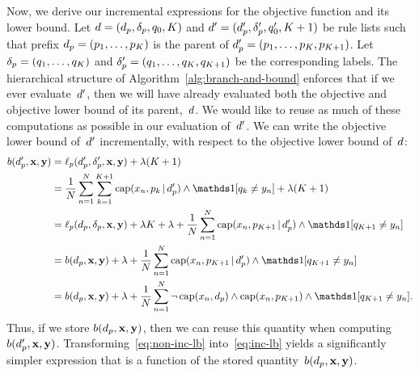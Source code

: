 \begin{arxiv}
Now, we derive our incremental expressions for the objective function and its lower bound.
%
Let ${{d} = (d_p, \delta_p, q_0, K)}$ and
${{d}' = (d_p', \delta_p', q_0', K + 1)}$
be rule lists such that prefix ${d_p = (p_1, \dots, p_K)}$
is the parent of ${d_p' = (p_1, \dots, p_K, p_{K+1})}$.
%
Let ${\delta_p = (q_1, \dots, q_K)}$ and
${\delta_p' = (q_1, \dots, q_K, q_{K+1})}$ be the corresponding labels.
%
The hierarchical structure of Algorithm~\ref{alg:branch-and-bound}
enforces that if we ever evaluate~${d}'$, then we will have already
evaluated both the objective and objective lower bound of its parent,~${d}$.
%
We would like to reuse as much of these computations as possible
in our evaluation of~${d}'$.
%
We can write the objective lower bound of~${d}'$ incrementally,
with respect to the objective lower bound of~${d}$:
\begin{align}
b(\Prefix', \x, \y)
  &= \Loss_p(\Prefix', \Labels', \x, \y) + \Reg (K + 1) \nn \\
&= \frac{1}{N} \sum_{n=1}^N \sum_{k=1}^{K+1} \Cap(x_n, p_k \given \Prefix')
  \wedge \one [ q_k \neq y_n ] + \Reg (K+1) \label{eq:non-inc-lb} \\
&= \Loss_p(\Prefix, \Labels, \x, \y) + \Reg K + \Reg
  + \frac{1}{N} \sum_{n=1}^N \Cap(x_n, p_{K+1} \given \Prefix') \wedge \one [q_{K+1} \neq y_n ] \nn \\
&= b(\Prefix, \x, \y) + \Reg
  + \frac{1}{N} \sum_{n=1}^N \Cap(x_n, p_{K+1} \given \Prefix') \wedge \one [q_{K+1} \neq y_n ] \nn \\
&= b(\Prefix, \x, \y) + \Reg  + \frac{1}{N} \sum_{n=1}^N \neg\, \Cap(x_n, \Prefix) \wedge
  \Cap(x_n, p_{K+1}) \wedge \one [q_{K+1} \neq y_n].
\label{eq:inc-lb}
\end{align}
Thus, if we store $b(d_p, \mathbf{x}, \mathbf{y})$, %
then we can reuse this quantity when computing $b(d_p', \mathbf{x}, \mathbf{y})$.
%
Transforming~\eqref{eq:non-inc-lb} into~\eqref{eq:inc-lb} yields a
significantly simpler expression that is a function of the stored
quantity~$b(d_p, \mathbf{x}, \mathbf{y})$. %

\end{arxiv}
